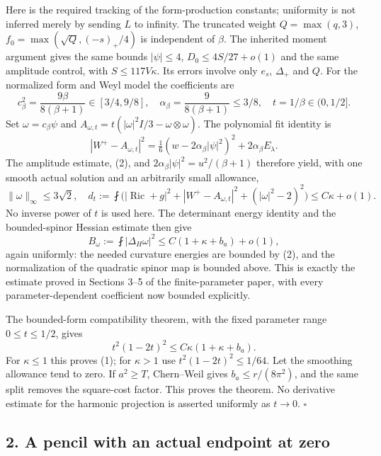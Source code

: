 \documentclass[
  11pt,
]{article}
\begin{document}
Here is the required tracking of the form-production constants;
uniformity is not inferred merely by sending \(L\) to infinity. The
truncated weight \(Q=\max(q,3)\), \(f_0=\max(\sqrt Q,(-s)_+/4)\) is
independent of \(\beta\). The inherited moment argument gives the same
bounds \(|\psi|\le4\), \(D_0\le4S/27+o(1)\) and the same amplitude
control, with \(S\le117V\kappa\). Its errors involve only \(e_s\),
\(\Delta_+\) and \(Q\). For the normalized form and Weyl model the
coefficients are \[
 c_\beta^2=\frac{9\beta}{8(\beta+1)}\in[3/4,9/8],\quad
 \alpha_\beta=\frac9{8(\beta+1)}\le3/8,\quad
 t=1/\beta\in(0,1/2].
\] Set \(\omega=c_\beta\psi\) and
\(A_{\omega,t}=t(|\omega|^2I/3-\omega\otimes\omega)\). The polynomial
fit identity is \[
 |W^+-A_{\omega,t}|^2
 =\tfrac16(w-2\alpha_\beta|\psi|^2)^2
                                  +2\alpha_\beta E_\lambda.
\] The amplitude estimate, (2), and
\(2\alpha_\beta|\psi|^2=u^2/(\beta+1)\) therefore yield, with one smooth
actual solution and an arbitrarily small allowance, \[
 \|\omega\|_\infty\le3\sqrt2,\quad
 d_t:=\fint\bigl(|\operatorname{Ric}+g|^2
   +|W^+-A_{\omega,t}|^2+(|\omega|^2-2)^2\bigr)
                       \le C\kappa+o(1).                 \tag{3}
\] No inverse power of \(t\) is used here. The determinant energy
identity and the bounded-spinor Hessian estimate then give \[
 B_\omega:=\fint|\Delta_H\omega|^2
                   \le C(1+\kappa+b_a)+o(1),             \tag{4}
\] again uniformly: the needed curvature energies are bounded by (2),
and the normalization of the quadratic spinor map is bounded above. This
is exactly the estimate proved in Sections 3--5 of the finite-parameter
paper, with every parameter-dependent coefficient now bounded
explicitly.

The bounded-form compatibility theorem, with the fixed parameter range
\(0\le t\le1/2\), gives \[
 t^2(1-2t)^2\le C\kappa(1+\kappa+b_a).                   \tag{5}
\] For \(\kappa\le1\) this proves (1); for \(\kappa>1\) use
\(t^2(1-2t)^2\le1/64\). Let the smoothing allowance tend to zero. If
\(a^2\ge T\), Chern--Weil gives \(b_a\le r/(8\pi^2)\), and the same
split removes the square-cost factor. This proves the theorem. No
derivative estimate for the harmonic projection is asserted uniformly as
\(t\to0\). \(\square\)

\hypertarget{a-pencil-with-an-actual-endpoint-at-zero}{%
\subsection{2. A pencil with an actual endpoint at
zero}\label{a-pencil-with-an-actual-endpoint-at-zero}}
\end{document}

